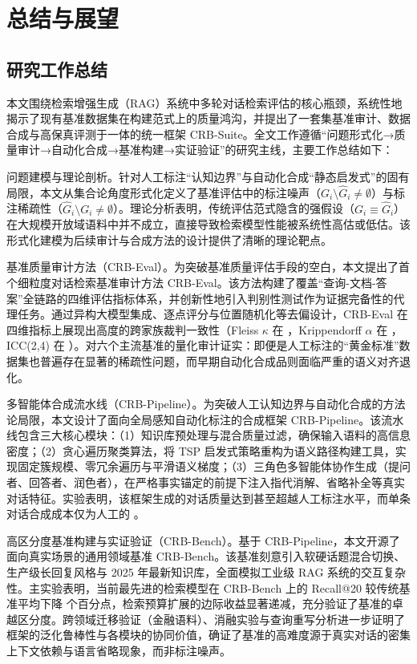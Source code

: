 \chapter{总结与展望}
\label{chap:conclusion}

\section{研究工作总结}
\label{sec:summary}

本文围绕检索增强生成（RAG）系统中多轮对话检索评估的核心瓶颈，系统性地揭示了现有基准数据集在构建范式上的质量鸿沟，并提出了一套集基准审计、数据合成与高保真评测于一体的统一框架 CRB-Suite。全文工作遵循“问题形式化→质量审计→自动化合成→基准构建→实证验证”的研究主线，主要工作总结如下：

问题建模与理论剖析。针对人工标注“认知边界”与自动化合成“静态启发式”的固有局限，本文从集合论角度形式化定义了基准评估中的标注噪声（$G_i \setminus \hat{G}_i \neq \emptyset$）与标注稀疏性（$\hat{G}_i \setminus G_i \neq \emptyset$）。理论分析表明，传统评估范式隐含的强假设（$G_i \equiv \hat{G}_i$）在大规模开放域语料中并不成立，直接导致检索模型性能被系统性高估或低估。该形式化建模为后续审计与合成方法的设计提供了清晰的理论靶点。

基准质量审计方法（CRB-Eval）。为突破基准质量评估手段的空白，本文提出了首个细粒度对话检索基准审计方法 CRB-Eval。该方法构建了覆盖“查询-文档-答案”全链路的四维评估指标体系，并创新性地引入判别性测试作为证据完备性的代理任务。通过异构大模型集成、逐点评分与位置随机化等去偏设计，CRB-Eval 在四维指标上展现出高度的跨家族裁判一致性（Fleiss $\kappa$ 在 ，Krippendorff $\alpha$ 在 ，ICC(2,4) 在 ）。对六个主流基准的量化审计证实：即便是人工标注的“黄金标准”数据集也普遍存在显著的稀疏性问题，而早期自动化合成品则面临严重的语义对齐退化。

多智能体合成流水线（CRB-Pipeline）。为突破人工认知边界与自动化合成的方法论局限，本文设计了面向全局感知自动化标注的合成框架 CRB-Pipeline。该流水线包含三大核心模块：（1）知识库预处理与混合质量过滤，确保输入语料的高信息密度；（2）贪心遍历聚类算法，将 TSP 启发式策略重构为语义路径构建工具，实现固定簇规模、零冗余遍历与平滑语义梯度；（3）三角色多智能体协作生成（提问者、回答者、润色者），在严格事实锚定的前提下注入指代消解、省略补全等真实对话特征。实验表明，该框架生成的对话质量达到甚至超越人工标注水平，而单条对话合成成本仅为人工的 。

高区分度基准构建与实证验证（CRB-Bench）。基于 CRB-Pipeline，本文开源了面向真实场景的通用领域基准 CRB-Bench。该基准刻意引入软硬话题混合切换、生产级长回复风格与 2025 年最新知识库，全面模拟工业级 RAG 系统的交互复杂性。主实验表明，当前最先进的检索模型在 CRB-Bench 上的 Recall@20 较传统基准平均下降  个百分点，检索预算扩展的边际收益显著递减，充分验证了基准的卓越区分度。跨领域迁移验证（金融语料）、消融实验与查询重写分析进一步证明了框架的泛化鲁棒性与各模块的协同价值，确证了基准的高难度源于真实对话的密集上下文依赖与语言省略现象，而非标注噪声。

